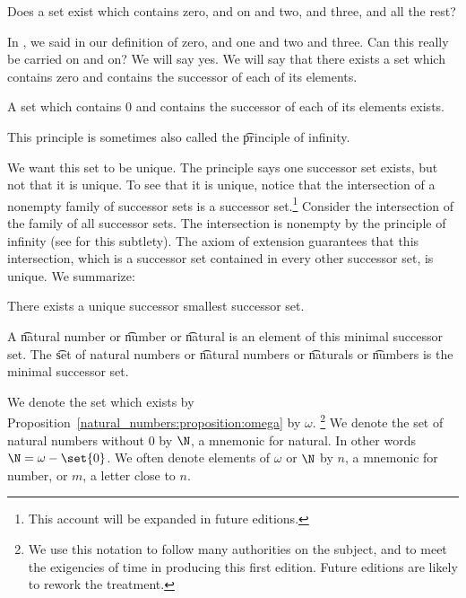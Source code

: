 

Does a set exist which contains zero, and on and two, and three, and all the rest?


In ,
we said  in our definition of zero, and one and two and three.
Can this really be carried on and on?
We will say yes.
We will say that there exists a set which contains zero and contains the successor of each of its elements.

\begin{principle}
  A set which contains 0 and contains the successor of each of its elements exists.
\end{principle}

This principle is sometimes also called the \t{principle of infinity}.

We want this set to be unique.
The principle says one successor set exists, but not that it is unique.
To see that it is unique, notice that the intersection of a nonempty family of successor sets is a successor set.\footnote{This account will be expanded in future editions.}
Consider the intersection of the family of all successor sets.
The intersection is nonempty by the principle of infinity (see  for this subtlety).
The axiom of extension guarantees that this intersection, which is a successor set contained in every other successor set, is unique.
We summarize:

\begin{proposition}
  There exists a unique successor smallest successor set.
  \label{natural_numbers:proposition:omega}
\end{proposition}

A \t{natural number} or \t{number} or \t{natural} is an element of this minimal successor set.
The \t{set of natural numbers} or \t{natural numbers} or \t{naturals} or \t{numbers} is the minimal successor set.


We denote the set which exists by Proposition~\ref{natural_numbers:proposition:omega} by $\omega$.
\footnote{We use this notation to follow many authorities on the subject, and to meet the exigencies of time in producing this first edition. Future editions are likely to rework the treatment.}
We denote the set of natural numbers without 0 by $\N$, a mnemonic for natural.
In other words $\N = \omega - \set{0}$.
We often denote elements of $\omega$ or $\N$ by $n$, a mnemonic for number, or $m$, a letter close to $n$.

